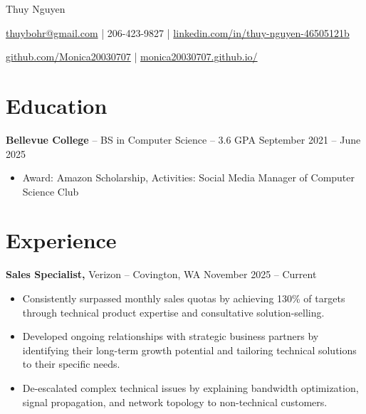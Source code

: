 \documentclass[11pt]{article}       %
\begin{document}
\centerline{\Huge Thuy Nguyen}

\vspace{5pt}

\centerline{\href{mailto:thuybohr@gmail.com}{thuybohr@gmail.com} | 206-423-9827 |
\href{https://www.linkedin.com/in/thuy-nguyen-46505121b/}{linkedin.com/in/thuy-nguyen-46505121b}}

\centerline{\href{https://github.com/Monica20030707}{github.com/Monica20030707} | 
\href{https://monica20030707.github.io/}{monica20030707.github.io/}} 

\vspace{-9pt}

\section*{Education}
\textbf{Bellevue College} -- BS in Computer Science -- 3.6 GPA \hfill September 2021 -- June 2025\\
\vspace{-9pt}
\begin{itemize}
  \item Award: Amazon Scholarship, Activities: Social Media Manager of Computer Science Club
\end{itemize}

\vspace{-18.5pt}

\section*{Experience}

\textbf{Sales Specialist,} {Verizon} -- Covington, WA \hfill November 2025 -- Current \\
\vspace{-9pt}
\begin{itemize}
  \item Consistently surpassed monthly sales quotas by achieving 130\% of targets through technical product expertise and consultative solution-selling.
  \item Developed ongoing relationships with strategic business partners by identifying their long-term growth potential and tailoring technical solutions to their specific needs.
  \item De-escalated complex technical issues by explaining bandwidth optimization, signal propagation, and network topology to non-technical customers.
\end{itemize}
\end{document}
